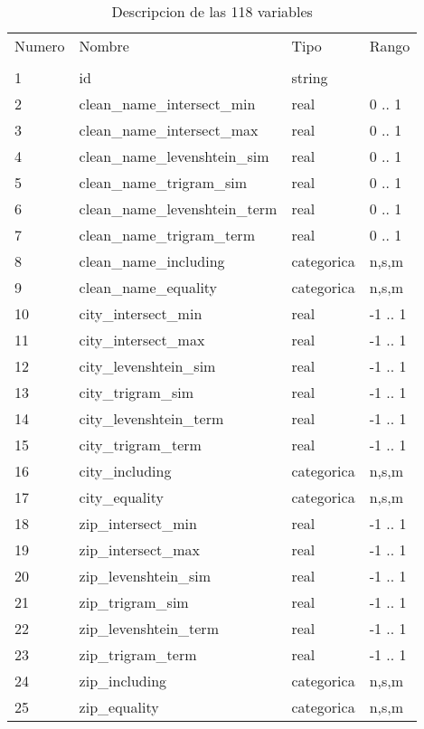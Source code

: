 \documentclass[journal]{IEEEtran}
\begin{document}
\begin{table}[ht!]
\caption{Descripcion de las 118 variables} 
\label{table:data_set}
\centering
\begin{tabular}{l | l l l}
Numero & Nombre & Tipo & Rango \\
       &        &      &                 \\
\hline
1	& id  & string &   \\
2	& clean\_name\_intersect\_min  &   real & 0 .. 1  \\
3	& clean\_name\_intersect\_max  &   real & 0 .. 1  \\
4	& clean\_name\_levenshtein\_sim  &   real & 0 .. 1  \\
5	& clean\_name\_trigram\_sim  &   real & 0 .. 1  \\
6	& clean\_name\_levenshtein\_term  &   real & 0 .. 1  \\
7	& clean\_name\_trigram\_term  &   real & 0 .. 1  \\
8	& clean\_name\_including  &    categorica &  n,s,m  \\
9	& clean\_name\_equality  &    categorica &  n,s,m  \\
10	& city\_intersect\_min  &   real & -1 .. 1  \\
11	& city\_intersect\_max  &   real & -1 .. 1 \\
12	& city\_levenshtein\_sim  &   real & -1 .. 1  \\
13	& city\_trigram\_sim  &   real & -1 .. 1  \\
14	& city\_levenshtein\_term  &   real & -1 .. 1  \\
15	& city\_trigram\_term  &   real & -1 .. 1  \\
16	& city\_including  &    categorica &  n,s,m  \\
17	& city\_equality  &    categorica &  n,s,m  \\
18	& zip\_intersect\_min  &   real & -1 .. 1  \\
19	& zip\_intersect\_max  &   real & -1 .. 1  \\
20	& zip\_levenshtein\_sim  &   real & -1 .. 1  \\
21	& zip\_trigram\_sim  &   real & -1 .. 1  \\
22	& zip\_levenshtein\_term  &   real & -1 .. 1  \\
23	& zip\_trigram\_term  &   real & -1 .. 1  \\
24	& zip\_including  &    categorica &  n,s,m  \\
25	& zip\_equality  &    categorica &  n,s,m  \\

\end{tabular}
\end{table}
\end{document}
